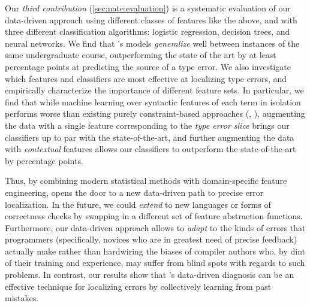 Our \emph{third contribution} (\autoref{sec:nate:evaluation})
is a systematic evaluation of our data-driven approach
using different classes of features like the above, and
with three different classification algorithms: logistic
regression, decision trees, and neural networks.
%
We find that \toolname's models \emph{generalize} well
between instances of the same undergraduate course, outperforming
the state of the art by at least \ToolnameWinSherrloc
percentage points at predicting the source of a type error.
%
We also investigate which features and classifiers
are most effective at localizing type errors, and
empirically characterize the importance of different
feature sets.
%
In particular, we find that while machine learning
over syntactic features of each term in isolation
performs worse than existing
purely constraint-based approaches (\eg \ocaml, \sherrloc),
augmenting the data with a single feature corresponding to
the \emph{type error slice} \citep{Tip2001-qp} brings our
classifiers up to par with the state-of-the-art,
and further augmenting the data with \emph{contextual}
features allows our classifiers to outperform
the state-of-the-art by \ToolnameWinSherrloc percentage points.

Thus, by combining modern statistical methods
with domain-specific feature engineering, \toolname
opens the door to a new data-driven path to
precise error localization.
%
In the future, we could \emph{extend}
\toolname to new languages or forms
of correctness checks by swapping in
a different set of feature abstraction
functions.
%
Furthermore, our data-driven approach
allows \toolname to \emph{adapt} to
the kinds of errors that programmers
(specifically, novices who are in greatest
need of precise feedback) actually make
rather than hardwiring the biases of
compiler authors who, by dint of their
training and experience, may suffer from
blind spots with regards to such problems.
%
In contrast, our results show that \toolname's
data-driven diagnosis can be an effective
technique for localizing errors by collectively
learning from past mistakes.

